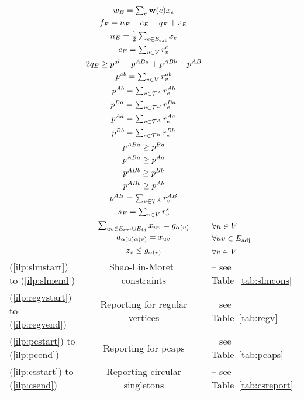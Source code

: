 \begin{algorithm}[tbh]
\begin{constraints}
\begin{tabular}{lcl}
    \cns & $w_E = \sum_e \mathbf{w}(e) x_e$\\
	\cns & $f_E = n_E - c_E + q_E + s_E$\\
    \cns & $n_E = \frac{1}{2} \sum_{e \in {E}_{\text{ext}}} x_{e}$\\
    \cns & $c_E = \sum_{v\in V} r^c_{v}$\\
    \cns & $2q_E \geq p^{a b}+ p^{ABa} + p^{ABb} - p^{A B} $\\
    \cns & $p^{a b} = \sum_{v \in V}r^{a b}_{v}$\\
    \cns & $p^{A b} = \sum_{v \in \mathcal{T}^A} r^{A b}_e$\\
    \cns & $p^{B a} = \sum_{v\in \mathcal{T}^B} r^{B a}_e$\\
    \cns & $p^{A a} = \sum_{v \in \mathcal{T}^A} r^{A a}_e$\\
    \cns & $p^{B b} = \sum_{e \in \mathcal{T}^B} r^{B b}_e$\\
    \cns & $p^{ABa} \geq p^{B a}$\\
    \cns & $p^{ABa} \geq p^{A a}$\\
    \cns & $p^{ABb} \geq p^{B b}$\\
    \cns & $p^{ABb} \geq p^{A b}$\\
    \cns & $p^{A B} = \sum_{v\in \mathcal{T}^A} r^{A B}_v$\\
    \cns & $s_E = \sum_{v\in V} r^{s}_{v}$ \\
    \cns & $\sum_{uv\in E_{ext} \cup E_{id} } x_{uv}= g_{\alpha(u)}$ & $\forall u\in V$  \\
    \cns & $a_{\alpha(u)\alpha(v)} = x_{uv}$ & $\forall uv \in {E}_\text{adj}$ \\
    \cns & $z_{v} \leq g_{\alpha (v)}$ & $\forall v \in V$ \\
    (\ref{ilp:slmstart}) to (\ref{ilp:slmend})& Shao-Lin-Moret~\cite{SHA-LIN-MOR-2015} constraints& -- see Table~\ref{tab:slmcons}\\
    (\ref{ilp:regvstart}) to (\ref{ilp:regvend})& Reporting for regular vertices& -- see Table~\ref{tab:regv}\\
    (\ref{ilp:pcstart}) to (\ref{ilp:pcend})& Reporting for \gls{pcaps}& -- see Table~\ref{tab:pcaps}\\
    (\ref{ilp:csstart}) to (\ref{ilp:csend})& Reporting circular singletons& --  see Table~\ref{tab:csreport}\\    
\end{tabular}

\end{constraints}
\end{algorithm}

